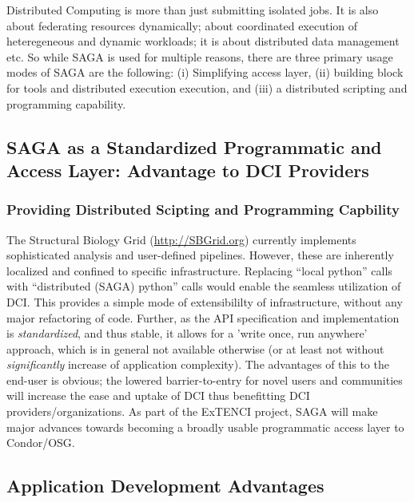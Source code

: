 \documentclass[10pt,conference,final,letterpaper,twoside,twocolumn,]{IEEEtran}
\newcommand{\I}[1]{\textit{#1}}
\begin{document}
Distributed Computing is more than just submitting isolated jobs.  It
is also about federating resources dynamically; about coordinated
execution of heteregeneous and dynamic workloads; it is about
distributed data management etc. So while SAGA is used for multiple
reasons, there are three primary usage modes of SAGA are the
following: (i) Simplifying access layer, (ii) building block for tools
and distributed execution execution, and (iii) a distributed scripting
and programming capability.


\subsection{SAGA as a Standardized Programmatic and Access Layer:
  Advantage to DCI Providers}

\subsubsection*{Providing Distributed Scipting and Programming Capbility}
The Structural Biology Grid (\url{http://SBGrid.org}) currently
implements sophisticated analysis and user-defined pipelines. However,
these are inherently localized and confined to specific
infrastructure.  Replacing ``local python'' calls with ``distributed
(SAGA) python'' calls would enable the seamless utilization of
DCI. This provides a simple mode of extensibililty of infrastructure,
without any major refactoring of code. Further, as the API
specification and implementation is \I{standardized}, and thus stable,
it allows for a 'write once, run anywhere' approach, which is in
general not available otherwise (or at least not without
\I{significantly} increase of application complexity).  The advantages
of this to the end-user is obvious; the lowered barrier-to-entry for
novel users and communities will increase the ease and uptake of DCI
thus benefitting DCI providers/organizations.  As part of the ExTENCI
project, SAGA will make major advances towards becoming a broadly
usable programmatic access layer to Condor/OSG.

\subsection{Application Development Advantages}
\end{document}
